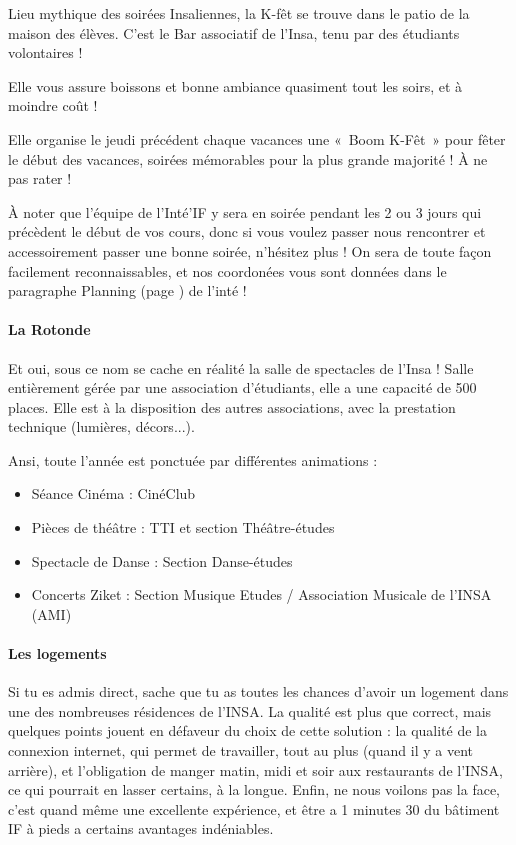 Lieu mythique des soirées Insaliennes, la K-fêt se trouve dans le patio de
la maison des élèves. C'est le Bar associatif de l'Insa, tenu par des
étudiants volontaires !

Elle vous assure boissons et bonne ambiance quasiment tout les soirs, et à
moindre coût !

Elle organise le jeudi précédent chaque vacances une «~Boom K-Fêt~» pour fêter
le début des vacances, soirées mémorables pour la plus grande majorité ! À ne
pas rater !

À noter que l'équipe de l'Inté'IF y sera en soirée pendant les 2 ou 3 jours qui
précèdent le début de vos cours, donc si vous voulez passer nous rencontrer et
accessoirement passer une bonne soirée, n'hésitez plus ! On sera de toute façon
facilement reconnaissables, et nos coordonées vous sont données dans le
paragraphe Planning (page \pageref{rplanning}) de l'inté !

\paragraph{La Rotonde}
Et oui, sous ce nom se cache en réalité la salle de spectacles de l'Insa !
Salle entièrement gérée par une association d'étudiants, elle a une
capacité de 500 places. Elle est à la disposition des autres associations, avec
la prestation technique (lumières, décors...).

Ansi, toute l'année est ponctuée par différentes animations :
\begin{itemize}
\item  Séance Cinéma : CinéClub
\item  Pièces de théâtre : TTI et section Théâtre-études
\item  Spectacle de Danse : Section Danse-études
\item  Concerts Ziket : Section Musique Etudes / Association Musicale de l'INSA (AMI) 
\end{itemize}

\paragraph{Les logements}
Si tu es admis direct, sache que tu as toutes les chances d'avoir un logement
dans une des nombreuses résidences de l'INSA. La qualité est plus que correct,
mais quelques points jouent en défaveur du choix de cette solution : la qualité
de la connexion internet, qui permet de travailler, tout au plus (quand il y a
vent arrière), et l'obligation de manger matin, midi et soir aux
restaurants de l'INSA, ce qui pourrait en lasser certains, à la longue.
Enfin, ne nous voilons pas la face, c'est quand même une excellente expérience,
et être a 1 minutes 30 du bâtiment IF à pieds a certains avantages
indéniables.
